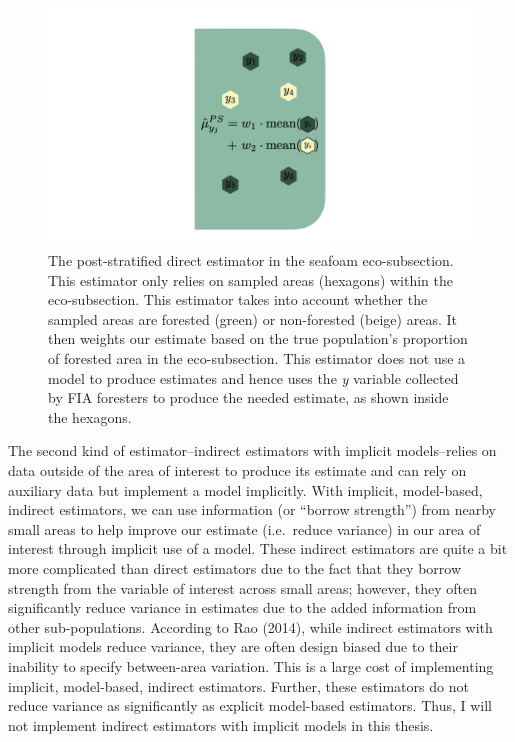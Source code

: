 \documentclass[12pt,twoside]{reedthesis}
\begin{document}
\begin{figure}

{\centering \includegraphics[width=1\linewidth]{figure/ps-diagram} 

}

\caption[The post-stratified direct estimator]{The post-stratified direct estimator in the seafoam eco-subsection. This estimator only relies on sampled areas (hexagons) within the eco-subsection. This estimator takes into account whether the sampled areas are forested (green) or non-forested (beige) areas. It then weights our estimate based on the true population's proportion of forested area in the eco-subsection. This estimator does not use a model to produce estimates and hence uses the \textit{y} variable collected by FIA foresters to produce the needed estimate, as shown inside the hexagons.}\label{fig:ps-diagram}
\end{figure}
The second kind of estimator--indirect estimators with implicit models--relies on data outside of the area of interest to produce its estimate and can rely on auxiliary data but implement a model implicitly. With implicit, model-based, indirect estimators, we can use information (or ``borrow strength'') from nearby small areas to help improve our estimate (i.e.~reduce variance) in our area of interest through implicit use of a model. These indirect estimators are quite a bit more complicated than direct estimators due to the fact that they borrow strength from the variable of interest across small areas; however, they often significantly reduce variance in estimates due to the added information from other sub-populations. According to Rao (2014), while indirect estimators with implicit models reduce variance, they are often design biased due to their inability to specify between-area variation. This is a large cost of implementing implicit, model-based, indirect estimators. Further, these estimators do not reduce variance as significantly as explicit model-based estimators. Thus, I will not implement indirect estimators with implicit models in this thesis.
\end{document}
